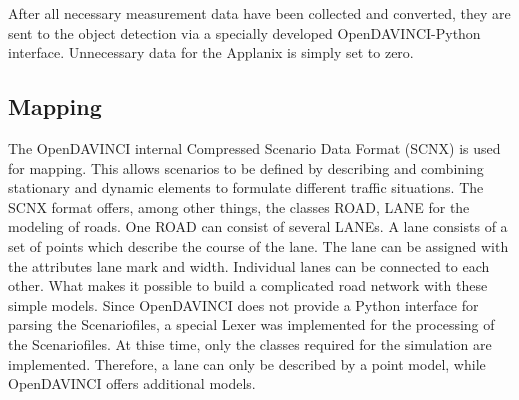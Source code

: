 \documentclass[11pt,oneside,openright]{mpreport}
\begin{document}
After all necessary measurement data have been collected and converted, they are sent to the object detection via a specially developed OpenDAVINCI-Python interface.
Unnecessary data for the Applanix is simply set to zero.

\subsection{Mapping}
The OpenDAVINCI internal Compressed Scenario Data Format (SCNX) \cite{Berger2010} is used for mapping. This allows scenarios to be defined by describing and combining stationary and dynamic elements
to formulate different traffic situations. The SCNX format offers, among other things, the classes ROAD, LANE for the modeling of roads. One ROAD can consist of several LANEs.
A lane consists of a set of points which describe the course of the lane. The lane can be assigned with the attributes lane mark and width. 
Individual lanes can be connected to each other. What makes it possible to build a complicated road network with these simple models. 
Since OpenDAVINCI does not provide a Python interface for parsing the Scenariofiles, a special Lexer was implemented for the processing of the Scenariofiles. 
At thise time, only the classes required for the simulation are implemented. Therefore, a lane can only be described by a point model, while OpenDAVINCI offers additional models.
\end{document}
